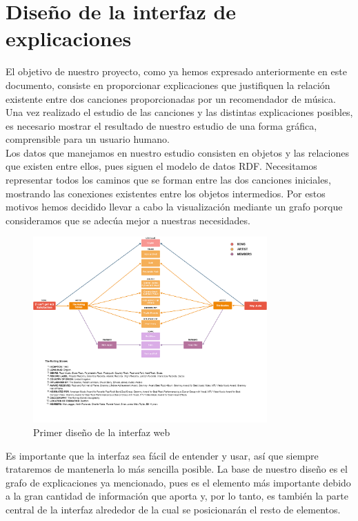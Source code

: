 \chapter{Diseño de la interfaz de explicaciones}
\label{cap:interfaz}

El objetivo de nuestro proyecto, como ya hemos expresado anteriormente en este documento, consiste en proporcionar explicaciones que justifiquen la relación existente entre dos canciones proporcionadas por un recomendador de música. Una vez realizado el estudio de las canciones y las distintas explicaciones posibles, es necesario mostrar el resultado de nuestro estudio de una forma gráfica, comprensible para un usuario humano.\\

Los datos que manejamos en nuestro estudio consisten en objetos y las relaciones que existen entre ellos, pues siguen el modelo de datos RDF. Necesitamos representar todos los caminos que se forman entre las dos canciones iniciales, mostrando las conexiones existentes entre los objetos intermedios. Por estos motivos hemos decidido llevar a cabo la visualización mediante un grafo porque consideramos que se adecúa mejor a nuestras necesidades.\\

\begin{figure}[h!]
	\centering
	\includegraphics[width = 0.8\textwidth]{Imagenes/Bitmap/InterfaceResult.png}
	\caption{Primer diseño de la interfaz web}
	\label{fig:sampleImage}
\end{figure}

Es importante que la interfaz sea fácil de entender y usar, así que siempre trataremos de mantenerla lo más sencilla posible. La base de nuestro diseño es el grafo de explicaciones ya mencionado, pues es el elemento más importante debido a la gran cantidad de información que aporta y, por lo tanto, es también la parte central de la interfaz alrededor de la cual se posicionarán el resto de elementos.\\

